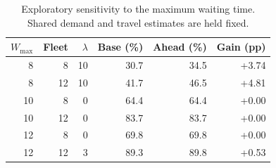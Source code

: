 \begin{table}[htbp]
\centering\small
\caption{Exploratory sensitivity to the maximum waiting time. Shared demand and travel estimates are held fixed.}
\label{tab:wait_sensitivity}
\begin{tabular}{rrrrrr}
\hline
$W_{\max}$ & Fleet & $\lambda$ & Base (\%) & Ahead (\%) & Gain (pp) \\
\hline
8 & 8 & 10 & 30.7 & 34.5 & +3.74 \\
8 & 12 & 10 & 41.7 & 46.5 & +4.81 \\
10 & 8 & 0 & 64.4 & 64.4 & +0.00 \\
10 & 12 & 0 & 83.7 & 83.7 & +0.00 \\
12 & 8 & 0 & 69.8 & 69.8 & +0.00 \\
12 & 12 & 3 & 89.3 & 89.8 & +0.53 \\
\hline
\end{tabular}
\end{table}